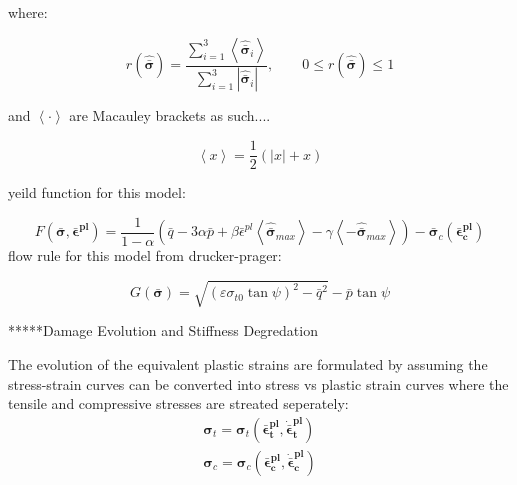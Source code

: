 where:

\begin{equation}
r\left(\hat{\boldsymbol{\bar{\sigma}}}\right)=\frac{\sum_{i=1}^{3}\left\langle \hat{\boldsymbol{\bar{\sigma}}}_{i}\right\rangle }{\sum_{i=1}^{3}\left|\hat{\boldsymbol{\bar{\sigma}}}_{i}\right|},\qquad0\leq r\left(\hat{\boldsymbol{\bar{\sigma}}}\right)\leq1\label{eqn:const9-2}
\end{equation}


and $\left\langle \cdotp\right\rangle $ are Macauley brackets as
such....

\begin{equation}
\left\langle x\right\rangle =\frac{1}{2}\left(\left|x\right|+x\right)\label{eqn:const9-3}
\end{equation}


yeild function for this model:

\begin{equation}
F\left(\boldsymbol{\bar{\sigma}},\boldsymbol{\bar{\epsilon}^{pl}}\right)=\frac{1}{1-\alpha}\left(\bar{q}-3\alpha\bar{p}+\beta\bar{\epsilon}^{pl}\left\langle \hat{\boldsymbol{\bar{\sigma}}}_{max}\right\rangle -\gamma\left\langle -\hat{\boldsymbol{\bar{\sigma}}}_{max}\right\rangle \right)-\bar{\boldsymbol{\sigma}}_{c}\left(\boldsymbol{\bar{\epsilon}_{c}^{pl}}\right)\label{eqn:const10}
\end{equation}
flow rule for this model from drucker-prager:

\begin{equation}
G\left(\boldsymbol{\bar{\sigma}}\right)=\sqrt{\left(\varepsilon\sigma_{t0}\tan\psi\right)^{2}-\bar{q}^{2}}-\bar{p}\tan\psi\label{eqn:const11}
\end{equation}


{*}{*}{*}{*}{*}Damage Evolution and Stiffness Degredation

The evolution of the equivalent plastic strains are formulated by
assuming the stress-strain curves can be converted into stress vs
plastic strain curves where the tensile and compressive stresses are
streated seperately: 
\begin{equation}
\begin{aligned}\boldsymbol{\sigma}_{t}=\boldsymbol{\sigma}_{t}\left(\boldsymbol{\bar{\epsilon}_{t}^{pl}},\boldsymbol{\dot{\bar{\epsilon}}_{t}^{pl}}\right)\\
\boldsymbol{\sigma}_{c}=\boldsymbol{\sigma}_{c}\left(\boldsymbol{\bar{\epsilon}_{c}^{pl}},\boldsymbol{\dot{\bar{\epsilon}}_{c}^{pl}}\right)
\end{aligned}
\label{eqn:dam1}
\end{equation}


